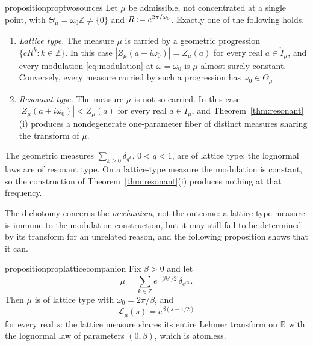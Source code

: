 \documentclass[sn-mathphys-num]{sn-jnl}
\theoremstyle{thmstyleone}%
\theoremstyle{thmstyletwo}%
\theoremstyle{thmstylethree}%
\theoremstyle{thmstyleone}%
\providecommand{\R}{\mathbb{R}}
\providecommand{\Z}{\mathbb{Z}}
\providecommand{\Leh}{\mathscr{L}}
\providecommand{\eqdef}{\mathrel{\vcentcolon=}}
\begin{document}
	\begin{restatable}{proposition}{proptwosources}\label{prop:twosources}
		Let $\mu$ be admissible, not concentrated at a single point, with
		$\Theta_\mu=\omega_0\Z\neq\{0\}$ and $R\eqdef e^{2\pi/\omega_0}$.
		Exactly one of the following holds.
		\begin{enumerate}[label=\textup{(\roman*)},leftmargin=2.2em]
			\item \emph{Lattice type.} The measure $\mu$ is carried by a
			geometric progression $\{cR^{k}:k\in\Z\}$. In this case
			$|Z_\mu(a+i\omega_0)|=Z_\mu(a)$ for every real
			$a\in\mathring I_\mu$, and every modulation
			\eqref{eq:modulation} at $\omega=\omega_0$ is $\mu$-almost
			surely constant. Conversely, every measure carried by such a
			progression has $\omega_0\in\Theta_\mu$.
			\item \emph{Resonant type.} The measure $\mu$ is not so
			carried. In this case
			$|Z_\mu(a+i\omega_0)|<Z_\mu(a)$ for every real
			$a\in\mathring I_\mu$, and Theorem~\ref{thm:resonant}(i)
			produces a nondegenerate one-parameter fiber of distinct
			measures sharing the transform of $\mu$.
		\end{enumerate}
	\end{restatable}
	
	The geometric measures $\sum_{k\ge0}\delta_{q^{k}}$, $0<q<1$,
	are of lattice type; the lognormal laws are of resonant type. On a
	lattice-type measure the modulation is constant, so the
	construction of Theorem~\ref{thm:resonant}(i) produces nothing at
	that frequency.
	
	
	The dichotomy concerns the \emph{mechanism}, not the outcome: a
	lattice-type measure is immune to the modulation construction, but
	it may still fail to be determined by its transform for an
	unrelated reason, and the following proposition shows that it can.
	
	\begin{restatable}{proposition}{proplatticecompanion}
		\label{prop:latticecompanion}
		Fix $\beta>0$ and let
		\begin{equation}\label{eq:latticecompanion}
			\mu=\sum_{k\in\Z}e^{-\beta k^{2}/2}\,\delta_{e^{\beta k}} .
		\end{equation}
		Then $\mu$ is of lattice type with $\omega_0=2\pi/\beta$, and
		\begin{equation}\label{eq:latticeLeh}
			\Leh_\mu(s)=e^{\beta(s-1/2)}
		\end{equation}
		for every real $s$: the lattice measure shares its entire
		Lehmer transform on $\R$ with the lognormal law of parameters
		$(0,\beta)$, which is atomless.
	\end{restatable}
	
\end{document}
